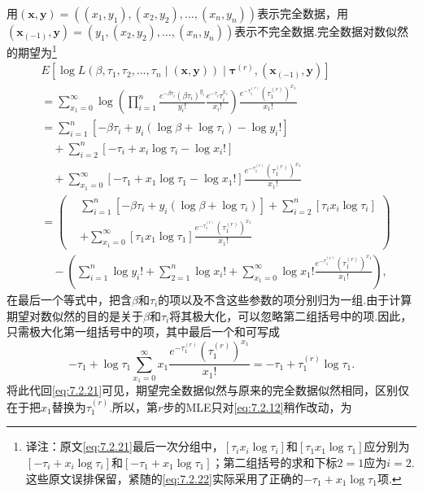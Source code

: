 \begin{example}\label{ex:7.2.19}
用$(\boldsymbol x,\boldsymbol y)=((x_1,y_1),(x_2,y_2),\ldots,(x_n,y_n))$表示完全数据，用$(\boldsymbol x_{(-1)},\boldsymbol y)=(y_1,(x_2,y_2),\ldots,(x_n,y_n))$表示不完全数据.完全数据对数似然的期望为\footnote{译注：原文\eqref{eq:7.2.21}最后一次分组中，$[\tau_ix_i\log\tau_i]$和$[\tau_1x_1\log\tau_1]$应分别为$[-\tau_i+x_i\log\tau_i]$和$[-\tau_1+x_1\log\tau_1]$；第二组括号的求和下标$2=1$应为$i=2$.这些原文误排保留，紧随的\eqref{eq:7.2.22}实际采用了正确的$-\tau_1+x_1\log\tau_1$项.}
\begin{equation}\label{eq:7.2.21}
\begin{aligned}
&E[\log L(\beta,\tau_1,\tau_2,\ldots,\tau_n\mid(\boldsymbol x,\boldsymbol y))\mid\boldsymbol\tau^{(r)},(\boldsymbol x_{(-1)},\boldsymbol y)]\\
&=\sum_{x_1=0}^\infty\log\left(\prod_{i=1}^n\frac{e^{-\beta\tau_i}(\beta\tau_i)^{y_i}}{y_i!}\frac{e^{-\tau_i}\tau_i^{x_i}}{x_i!}\right)\frac{e^{-\tau_1^{(r)}}(\tau_1^{(r)})^{x_1}}{x_1!}\\
&=\sum_{i=1}^n[-\beta\tau_i+y_i(\log\beta+\log\tau_i)-\log y_i!]\\
&\quad+\sum_{i=2}^n[-\tau_i+x_i\log\tau_i-\log x_i!]\\
&\quad+\sum_{x_1=0}^\infty[-\tau_1+x_1\log\tau_1-\log x_1!]\frac{e^{-\tau_1^{(r)}}(\tau_1^{(r)})^{x_1}}{x_1!}\\
&=\left(\begin{aligned}&\sum_{i=1}^n[-\beta\tau_i+y_i(\log\beta+\log\tau_i)]+\sum_{i=2}^n[\tau_ix_i\log\tau_i]\\
&+\sum_{x_1=0}^\infty[\tau_1x_1\log\tau_1]\frac{e^{-\tau_1^{(r)}}(\tau_1^{(r)})^{x_1}}{x_1!}\end{aligned}\right)\\
&\quad-\left(\sum_{i=1}^n\log y_i!+\sum_{2=1}^n\log x_i!+\sum_{x_1=0}^\infty\log x_1!\frac{e^{-\tau_1^{(r)}}(\tau_1^{(r)})^{x_1}}{x_1!}\right),
\end{aligned}
\end{equation}
在最后一个等式中，把含$\beta$和$\tau_i$的项以及不含这些参数的项分别归为一组.由于计算期望对数似然的目的是关于$\beta$和$\tau_i$将其极大化，可以忽略第二组括号中的项.因此，只需极大化第一组括号中的项，其中最后一个和可写成
\begin{equation}\label{eq:7.2.22}
-\tau_1+\log\tau_1\sum_{x_1=0}^\infty x_1\frac{e^{-\tau_1^{(r)}}(\tau_1^{(r)})^{x_1}}{x_1!}=-\tau_1+\tau_1^{(r)}\log\tau_1.
\end{equation}
将此代回\eqref{eq:7.2.21}可见，期望完全数据似然与原来的完全数据似然相同，区别仅在于把$x_1$替换为$\tau_1^{(r)}$.所以，第$r$步的MLE只对\eqref{eq:7.2.12}稍作改动，为

\end{example}
